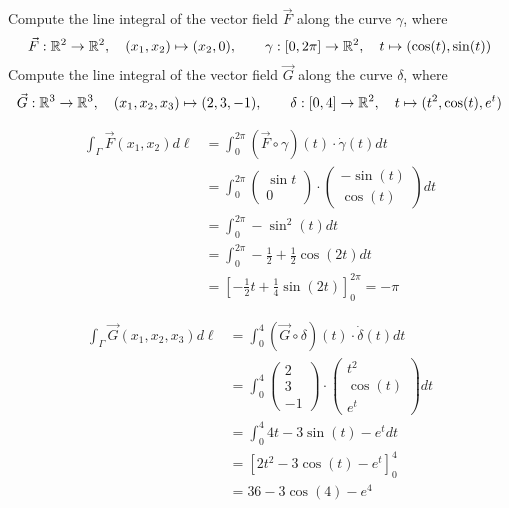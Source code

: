 \documentclass[11pt]{article}
\begin{document}

\begin{exercise}
    Compute the line integral of the vector field $\vec{F}$ along the curve $\gamma$, where 
    \[
        \vec F : \mathbb{R}^2 \to \mathbb{R}^2, \quad (x_1,x_2) \mapsto ( x_2, 0 ), \qquad \gamma : [0,2\pi]  \to \mathbb{R}^2, \quad t \mapsto ( \cos(t), \sin(t) )
    \]
    Compute the line integral of the vector field $\vec{G}$ along the curve $\delta$, where 
    \[
        \vec G : \mathbb{R}^3 \to \mathbb{R}^3, \quad (x_1,x_2,x_3) \mapsto ( 2, 3, -1 ), \qquad \delta : [0,4]  \to \mathbb{R}^2, \quad t \mapsto  ( t^2, \cos(t), e^t )
    \]
\end{exercise}
\begin{solution}
    \begin{align*}
        \int_{\Gamma} \vec{F}(x_1,x_2) d\ell &= \int_{0}^{2\pi} (\vec{F}\circ \gamma)(t)\cdot \dot{\gamma}(t)dt\\
        &= \int_{0}^{2\pi} \begin{pmatrix}\sin t\\ 0\end{pmatrix}\cdot \begin{pmatrix} -\sin(t)\\ \cos(t)\end{pmatrix}dt\\
        &= \int_{0}^{2\pi}  -\sin^2(t)dt\\
        &= \int_{0}^{2\pi}  -\frac{1}{2}+\frac{1}{2}\cos(2t)dt\\
        &= \left[-\frac{1}{2}t + \frac{1}{4}\sin(2t)\right]_{0}^{2\pi} = -\pi
    \end{align*}

    \begin{align*}
        \int_{\Gamma} \vec{G}(x_1,x_2,x_3) d\ell &= \int_{0}^{4} (\vec{G}\circ \delta)(t)\cdot \dot{\delta}(t)dt\\
        &= \int_{0}^{4}\begin{pmatrix} 2\\ 3\\ -1\end{pmatrix} \cdot  \begin{pmatrix}t^2\\ \cos(t) \\ e^t \end{pmatrix}dt\\
        &= \int_{0}^{4} 4t - 3\sin(t) - e^t dt\\
        &= \left[2t^2 - 3\cos(t) - e^{t} \right]_{0}^{4}\\
        &= 36 -3\cos(4)-e^4
    \end{align*}
\end{solution}
\end{document}

